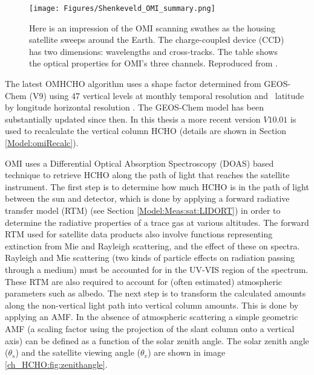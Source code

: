   \begin{figure}
    \texttt{[image: Figures/Shenkeveld\_OMI\_summary.png]}
    \caption{ %
      Here is an impression of the OMI scanning swathes as the housing satellite sweeps around the Earth.
      The charge-coupled device (CCD) has two dimensions: wavelengths and cross-tracks.
      The table shows the optical properties for OMI's three channels.
      Reproduced from \textcite{Schenkeveld2017}.
    }\label{Model:omhcho:fig_Shenkeveld_OMI_summary}
  \end{figure}
  
  The latest OMHCHO algorithm uses a shape factor determined from GEOS-Chem (V9) using 47 vertical levels at monthly temporal resolution and \lowhr ~latitude by longitude horizontal resolution \parencite{Abad2015}.
  The GEOS-Chem model has been substantially updated since then.
  In this thesis a more recent version $V10.01$ is used to recalculate the vertical column HCHO (details are shown in Section \ref{Model:omiRecalc}).
  
  OMI uses a Differential Optical Absorption Spectroscopy (DOAS) based technique to retrieve HCHO along the path of light that reaches the satellite instrument.
  The first step is to determine how much HCHO is in the path of light between the sun and detector, which is done by applying a forward radiative transfer model (RTM) (see Section \ref{Model:Meas:sat:LIDORT}) in order to determine the radiative properties of a trace gas at various altitudes.
  The forward RTM used for satellite data products also involve functions representing extinction from Mie and Rayleigh scattering, and the effect of these on spectra.
  Rayleigh and Mie scattering (two kinds of particle effects on radiation passing through a medium) must be accounted for in the UV-VIS region of the spectrum.
  These RTM are also required to account for (often estimated) atmospheric parameters such as albedo.
  The next step is to transform the calculated amounts along the non-vertical light path into vertical column amounts.
  This is done by applying an AMF.
  In the absence of atmospheric scattering a simple geometric AMF (a scaling factor using the projection of the slant column onto a vertical axis) can be defined as a function of the solar zenith angle. 
  The solar zenith angle ($\theta_s$) and the satellite viewing angle ($\theta_v$) are shown in image \ref{ch_HCHO:fig:zenithangle}.
  
